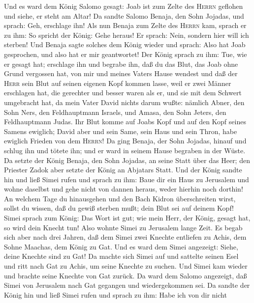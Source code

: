  Und es ward dem König Salomo gesagt: Joab ist zum Zelte
des \textsc{Herrn} geflohen und siehe, er steht am Altar! Da sandte
Salomo Benaja, den Sohn Jojadas, und sprach: Geh, erschlage ihn!
 Als nun Benaja zum Zelte des \textsc{Herrn} kam, sprach
er zu ihm: So spricht der König: Gehe heraus! Er sprach: Nein, sondern
hier will ich sterben! Und Benaja sagte solches dem König wieder und
sprach: Also hat Joab gesprochen, und also hat er mir geantwortet!
 Der König sprach zu ihm: Tue, wie er gesagt hat;
erschlage ihn und begrabe ihn, daß du das Blut, das Joab ohne Grund
vergossen hat, von mir und meines Vaters Hause wendest 
und daß der \textsc{Herr} sein Blut auf seinen eigenen Kopf kommen
lasse, weil er zwei Männer erschlagen hat, die gerechter und besser
waren als er, und sie mit dem Schwert umgebracht hat, da mein Vater
David nichts darum wußte: nämlich Abner, den Sohn Ners, den
Feldhauptmann Israels, und Amasa, den Sohn Jeters, den Feldhauptmann
Judas.  Ihr Blut komme auf Joabs Kopf und auf den Kopf
seines Samens ewiglich; David aber und sein Same, sein Haus und sein
Thron, habe ewiglich Frieden von dem \textsc{Herrn}!  Da
ging Benaja, der Sohn Jojadas, hinauf und schlug ihn und tötete ihn; und
er ward in seinem Hause begraben in der Wüste.  Da setzte
der König Benaja, den Sohn Jojadas, an seine Statt über das Heer; den
Priester Zadok aber setzte der König an Abjatars Statt. 
Und der König sandte hin und ließ Simei rufen und sprach zu ihm: Baue
dir ein Haus zu Jerusalem und wohne daselbst und gehe nicht von dannen
heraus, weder hierhin noch dorthin!  An welchem Tage du
hinausgehen und den Bach Kidron überschreiten wirst, sollst du wissen,
daß du gewiß sterben mußt; dein Blut sei auf deinem Kopf!
 Simei sprach zum König: Das Wort ist gut; wie mein Herr,
der König, gesagt hat, so wird dein Knecht tun! Also wohnte Simei zu
Jerusalem lange Zeit.  Es begab sich aber nach drei
Jahren, daß dem Simei zwei Knechte entliefen zu Achis, dem Sohne
Maachas, dem König zu Gat. Und es ward dem Simei angezeigt: Siehe, deine
Knechte sind zu Gat!  Da machte sich Simei auf und
sattelte seinen Esel und ritt nach Gat zu Achis, um seine Knechte zu
suchen. Und Simei kam wieder und brachte seine Knechte von Gat zurück.
 Da ward dem Salomo angezeigt, daß Simei von Jerusalem
nach Gat gegangen und wiedergekommen sei.  Da sandte der
König hin und ließ Simei rufen und sprach zu ihm: Habe ich von dir nicht
